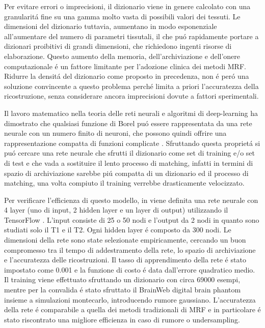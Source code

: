 \documentclass[a4paper,10pt]{article}
\begin{document}
 Per evitare errori o imprecisioni, il dizionario viene in genere calcolato con una granularit\'a fine su una gamma molto vasta di possibili valori dei tessuti. Le dimensioni del dizionario tuttavia, aumentano in modo esponenziale all'aumentare del numero di parametri tissutali, il che pu\'o rapidamente portare a dizionari proibitivi di grandi dimensioni, che richiedono ingenti risorse di elaborazione. Questo aumento della memoria, dell'archiviazione e dell'onere computazionale \'e un fattore limitante per l'adozione clinica dei metodi MRF. Ridurre la densit\'a del dizionario come proposto in precedenza, non \'e per\'o una soluzione convincente a questo problema perch\'e limita a priori l'accuratezza della ricostruzione, senza considerare ancora imprecisioni dovute a fattori sperimentali. 
 
 Il lavoro matematico nella teoria delle reti neurali e algoritmi di deep-learning ha dimostrato che qualsiasi funzione di Borel pu\'o essere rappresentata da una rete neurale con un numero finito di neuroni, che possono quindi offrire una rappresentazione compatta di funzioni complicate \cite{hornik1989multilayer}. Sfruttando questa propriet\'a si pu\'o cercare una rete neurale che sfrutti il dizionario come set di training e/o set di test e che vada a sostituire il lento processo di matching, infatti in termini di spazio di archiviazione sarebbe pi\'u compatta di un dizionario ed il processo di matching, una volta compiuto il training verrebbe drasticamente velocizzato.
 
 Per verificare l'efficienza di questo modello, in \cite{cohen2018mr} viene definita una rete neurale con 4 layer (uno di input, 2 hidden layer e un layer di output) utilizzando il TensorFlow \cite{abadi2016tensorflow}. L'input consiste di 25 o 50 nodi e l'output da 2 nodi in quanto sono studiati solo il T1 e il T2. Ogni hidden layer \'e composto da 300 nodi. Le dimensioni della rete sono state selezionate empiricamente, cercando un buon compromesso tra il tempo di addestramento della rete, lo spazio di archiviazione e l'accuratezza delle ricostruzioni. Il tasso di apprendimento della rete \'e stato impostato come 0.001 e la funzione di costo \'e data dall'errore quadratico medio. Il training viene effettuato sfruttando un dizionario con circa 69000 esempi, mentre per la convalida \'e stato sfruttato il BrainWeb digital brain phantom insieme a simulazioni montecarlo, introducendo rumore  gaussiano. L'accuratezza della rete \'e comparabile a quella dei metodi tradizionali di MRF e in particolare \'e stato riscontrato una migliore efficienza in caso di rumore o undersampling.
 
\end{document}
